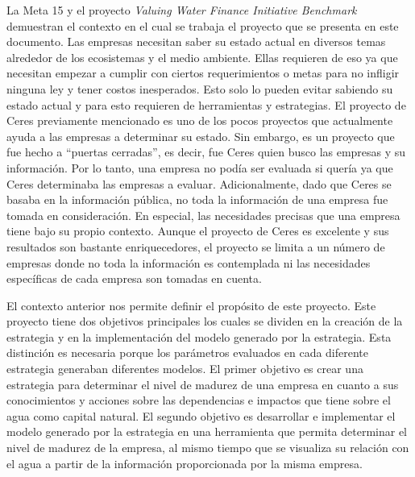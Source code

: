La Meta 15 y el proyecto \textit{Valuing Water Finance Initiative Benchmark} demuestran el contexto en el cual se trabaja el proyecto que se presenta en este documento. Las empresas necesitan saber su estado actual en diversos temas alrededor de los ecosistemas y el medio ambiente. Ellas requieren de eso ya que necesitan empezar a cumplir con ciertos requerimientos o metas para no infligir ninguna ley y tener costos inesperados. Esto solo lo pueden evitar sabiendo su estado actual y para esto requieren de herramientas y estrategias. El proyecto de Ceres previamente mencionado es uno de los pocos proyectos que actualmente ayuda a las empresas a determinar su estado. Sin embargo, es un proyecto que fue hecho a “puertas cerradas”, es decir, fue Ceres quien busco las empresas y su información. Por lo tanto, una empresa no podía ser evaluada si quería ya que Ceres determinaba las empresas a evaluar. Adicionalmente, dado que Ceres se basaba en la información pública, no toda la información de una empresa fue tomada en consideración. En especial, las necesidades precisas que una empresa tiene bajo su propio contexto. Aunque el proyecto de Ceres es excelente y sus resultados son bastante enriquecedores, el proyecto se limita a un número de empresas donde no toda la información es contemplada ni las necesidades específicas de cada empresa son tomadas en cuenta. 

\hfill

El contexto anterior nos permite definir el propósito de este proyecto. Este proyecto tiene dos objetivos principales los cuales se dividen en la creación de la estrategia y en la implementación del modelo generado por la estrategia. Esta distinción es necesaria porque los parámetros evaluados en cada diferente estrategia generaban diferentes modelos. El primer objetivo es crear una estrategia para determinar el nivel de madurez de una empresa en cuanto a sus conocimientos y acciones sobre las dependencias e impactos que tiene sobre el agua como capital natural. El segundo objetivo es desarrollar e implementar el modelo generado por la estrategia en una herramienta que permita determinar el nivel de madurez de la empresa, al mismo tiempo que se visualiza su relación con el agua a partir de la información proporcionada por la misma empresa. 

